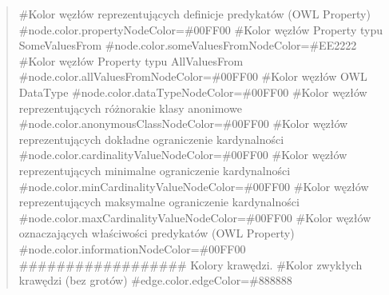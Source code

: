 \documentclass[a4paper,10pt]{article}
\begin{document}
\begin{quote}
\#Kolor węzłów reprezentujących definicje predykatów (OWL Property) \newline
\#node.color.propertyNodeColor=\#00FF00 \newline
 \newline
\#Kolor węzłów Property typu SomeValuesFrom \newline
\#node.color.someValuesFromNodeColor=\#EE2222 \newline
 \newline
\#Kolor węzłów Property typu AllValuesFrom \newline
\#node.color.allValuesFromNodeColor=\#00FF00 \newline
 \newline
\#Kolor węzłów OWL DataType \newline
\#node.color.dataTypeNodeColor=\#00FF00 \newline
 \newline
\#Kolor węzłów reprezentujących różnorakie klasy anonimowe \newline
\#node.color.anonymousClassNodeColor=\#00FF00 \newline
 \newline
\#Kolor węzłów reprezentujących dokładne ograniczenie kardynalności \newline
\#node.color.cardinalityValueNodeColor=\#00FF00 \newline
 \newline
\#Kolor węzłów reprezentujących minimalne ograniczenie kardynalności \newline
\#node.color.minCardinalityValueNodeColor=\#00FF00 \newline
 \newline
\#Kolor węzłów reprezentujących maksymalne ograniczenie kardynalności \newline
\#node.color.maxCardinalityValueNodeColor=\#00FF00 \newline
 \newline
\#Kolor węzłów oznaczających właściwości predykatów (OWL Property) \newline
\#node.color.informationNodeColor=\#00FF00 \newline
 \newline
\#\#\#\#\#\#\#\#\#\#\#\#\#\#\#\#\#\# Kolory krawędzi. \newline
 \newline
\#Kolor zwykłych krawędzi (bez grotów) \newline
\#edge.color.edgeColor=\#888888 \newline
 \newline

\end{quote}
\end{document}
